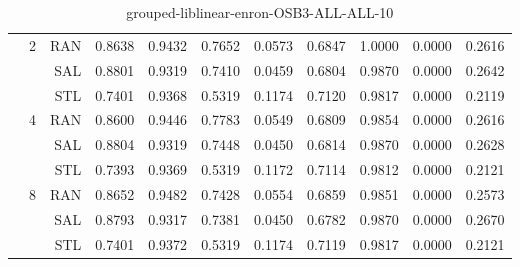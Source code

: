 \begin{center}
\begin{table}[htbp]
\begin{tabular}{ | r | r | r | r | r | r | r | r | r | r | r |}
 & \multirow{3}{*}{2} & RAN & 0.8638 & 0.9432 & 0.7652 & 0.0573 & 0.6847 & 1.0000 & 0.0000 & 0.2616\\ \cline{3-11}
 &   & SAL & 0.8801 & 0.9319 & 0.7410 & 0.0459 & 0.6804 & 0.9870 & 0.0000 & 0.2642\\ \cline{3-11}
 &   & STL & 0.7401 & 0.9368 & 0.5319 & 0.1174 & 0.7120 & 0.9817 & 0.0000 & 0.2119\\ \cline{2-11}
 & \multirow{3}{*}{4} & RAN & 0.8600 & 0.9446 & 0.7783 & 0.0549 & 0.6809 & 0.9854 & 0.0000 & 0.2616\\ \cline{3-11}
 &   & SAL & 0.8804 & 0.9319 & 0.7448 & 0.0450 & 0.6814 & 0.9870 & 0.0000 & 0.2628\\ \cline{3-11}
 &   & STL & 0.7393 & 0.9369 & 0.5319 & 0.1172 & 0.7114 & 0.9812 & 0.0000 & 0.2121\\ \cline{2-11}
 & \multirow{3}{*}{8} & RAN & 0.8652 & 0.9482 & 0.7428 & 0.0554 & 0.6859 & 0.9851 & 0.0000 & 0.2573\\ \cline{3-11}
 &   & SAL & 0.8793 & 0.9317 & 0.7381 & 0.0450 & 0.6782 & 0.9870 & 0.0000 & 0.2670\\ \cline{3-11}
 &   & STL & 0.7401 & 0.9372 & 0.5319 & 0.1174 & 0.7119 & 0.9817 & 0.0000 & 0.2121\\ \cline{2-11}
\hline
\end{tabular}
\caption{grouped-liblinear-enron-OSB3-ALL-ALL-10}
\end{table}
\end{center}

